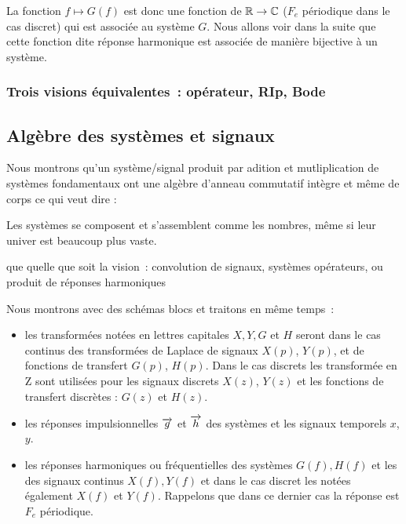
La fonction $f\mapsto G(f)$ est donc une fonction de $\mathbb{R}\to\mathbb{C}$ ($F_e$
périodique dans le cas discret) qui est associée au système $G$. Nous
allons voir dans la suite que cette fonction dite réponse harmonique
est associée de manière bijective à un système.

\subsubsection{Trois visions équivalentes~: opérateur, RIp, Bode}


\subsection{Algèbre des systèmes et signaux}
Nous montrons qu'un système/signal produit par adition et
mutliplication de systèmes fondamentaux ont une algèbre d'anneau
commutatif intègre et même de corps ce qui veut dire :

\begin{citation}
  Les systèmes se composent et s'assemblent comme les nombres, même si leur univer est beaucoup plus vaste.
\end{citation}


que quelle que soit la vision~: convolution de signaux,
systèmes opérateurs, ou produit de réponses harmoniques 

Nous montrons avec des schémas blocs et traitons en même temps~:
\begin{itemize}
\item les transformées notées en lettres capitales $X, Y, G$ et $H$
  seront dans le cas continus des transformées de Laplace de signaux
  $X(p)$, $Y(p)$, et de fonctions de transfert $G(p)$, $H(p)$. Dans le
  cas discrets les transformée en Z sont utilisées pour les signaux
  discrets $X(z)$, $Y(z)$ et les fonctions de transfert discrètes :
  $G(z)$ et $H(z)$.
\item les réponses impulsionnelles $\overrightarrow{g}$ et $\overrightarrow{h}$ des systèmes et les
  signaux temporels $x$, $y$.
\item les réponses harmoniques ou fréquentielles des systèmes
  $G(f), H(f)$ et les \TF{} des signaux continus $X(f), Y(f)$ et dans
  le cas discret les \TFSD{} notées également $X(f)$ et
  $Y(f)$. Rappelons que dans ce dernier cas la réponse est $F_e$
  périodique.
\end{itemize}

